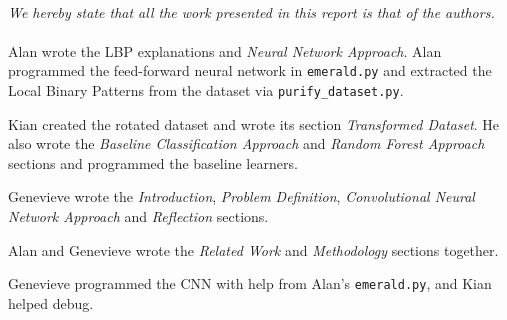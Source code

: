 \newpage
\begin{multicols}{2}
\paragraph*{} \lettrine[nindent=0em,lines=1]{\textit{W}}{}\textit{e hereby state that all the work presented in this report is that of the authors. }
\paragraph*{} Alan wrote the LBP explanations and \emph{Neural Network Approach}. Alan programmed the feed-forward neural network in \texttt{emerald.py} and extracted the Local Binary Patterns from the dataset via \texttt{purify\_dataset.py}. 
\par Kian created the rotated dataset and wrote its section \emph{Transformed Dataset}. He also wrote the \emph{Baseline Classification Approach} and \emph{Random Forest Approach} sections and programmed the baseline learners. 
\par Genevieve wrote the \emph{Introduction}, \emph{Problem Definition}, \emph{Convolutional Neural Network Approach} and \emph{Reflection} sections.
\par Alan and Genevieve wrote the \emph{Related Work} and \emph{Methodology} sections together. 
\par Genevieve programmed the CNN with help from Alan's \texttt{emerald.py}, and Kian helped debug. 



\end{multicols}

